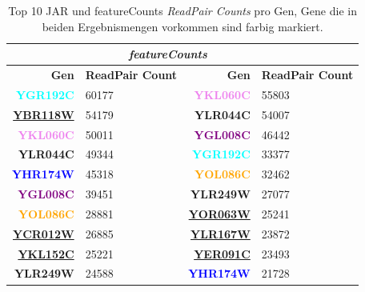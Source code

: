 \documentclass[12pt]{article}
\begin{document}
\begin{table}[htpb]
\centering
\renewcommand{\arraystretch}{1.2}
\setlength{\tabcolsep}{8pt}
\begin{tabular}{|>{\bfseries}r|l|>{\bfseries}r|l|}
\hline
\rowcolor{gray!20} \multicolumn{2}{|c|}{\textit{JAR}} & \multicolumn{2}{c|}{\textit{featureCounts}} \\
\hline
\textbf{Gen} & \textbf{ReadPair Count} & \textbf{Gen} & \textbf{ReadPair Count} \\
\hline
\textcolor{cyan}{YGR192C} & 60177 & \textcolor{violet}{YKL060C} & 55803 \\
\underline{YBR118W}                  & 54179 & \textcolor{pink!90}{YLR044C} & 54007 \\
\textcolor{violet}{YKL060C} & 50011 & \textcolor{purple}{YGL008C} & 46442 \\
\textcolor{pink!90}{YLR044C} & 49344 & \textcolor{cyan}{YGR192C}                 & 33377 \\
\textcolor{blue}{YHR174W} & 45318 & \textcolor{orange}{YOL086C} & 32462 \\
\textcolor{purple}{YGL008C} & 39451 & \textcolor{blue!40}{YLR249W} & 27077 \\
\textcolor{orange}{YOL086C} & 28881 & \underline{YOR063W}                 & 25241 \\
\underline{YCR012W}                  & 26885 & \underline{YLR167W}                 & 23872 \\
    \underline{YKL152C}  & 25221 & \underline{YER091C}                 & 23493 \\
\textcolor{blue!40}{YLR249W} & 24588 & \textcolor{blue}{YHR174W} & 21728 \\
\hline
\end{tabular}
\caption{Top 10 JAR und featureCounts \textit{ReadPair Counts} pro Gen, Gene die in beiden Ergebnismengen vorkommen sind farbig markiert.}
\label{tab:comp}
\end{table}







\newpage
\printbibliography


\end{document}

